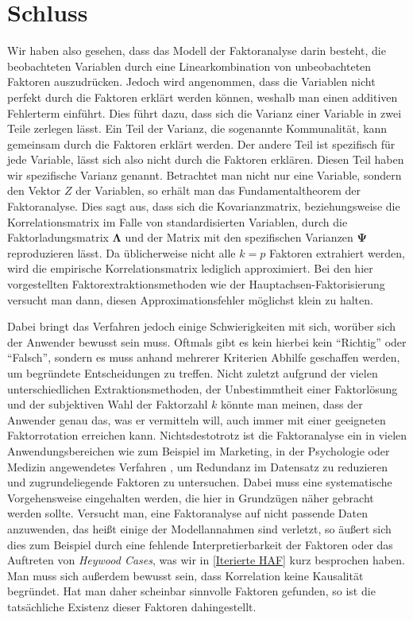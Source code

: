 \documentclass[11pt]{scrartcl}
\begin{document}
	
	\newpage
	\section{Schluss}
	
	Wir haben also gesehen, dass das Modell der Faktoranalyse darin besteht, die beobachteten
	Variablen durch eine Linearkombination von unbeobachteten Faktoren auszudrücken. Jedoch wird angenommen, dass die Variablen nicht
	perfekt durch die Faktoren erklärt werden können, weshalb man einen additiven Fehlerterm einführt.
	Dies führt dazu, dass sich die Varianz einer Variable in zwei Teile zerlegen lässt. Ein Teil der Varianz, die sogenannte Kommunalität,
	kann gemeinsam durch die Faktoren erklärt werden. Der andere Teil ist
	spezifisch für jede Variable, lässt sich also nicht durch die Faktoren erklären. Diesen Teil haben wir spezifische
	Varianz genannt. Betrachtet man nicht nur eine Variable, sondern den Vektor $Z$ der Variablen, so
	erhält man das Fundamentaltheorem der Faktoranalyse. Dies sagt aus, dass sich die Kovarianzmatrix,
	beziehungsweise die Korrelationsmatrix im Falle von standardisierten Variablen, durch die Faktorladungsmatrix $\mathbf{\Lambda}$
	und der Matrix mit den spezifischen Varianzen $\mathbf{\Psi}$ reproduzieren lässt. Da üblicherweise nicht alle $k = p$ Faktoren
	extrahiert werden, wird die empirische Korrelationsmatrix lediglich approximiert. 
	Bei den hier vorgestellten Faktorextraktionsmethoden
	wie der Hauptachsen-Faktorisierung versucht man dann, diesen Approximationsfehler möglichst klein zu halten.
	
	Dabei bringt das Verfahren jedoch einige Schwierigkeiten mit sich, worüber sich der Anwender bewusst sein muss.
	Oftmals gibt es kein hierbei kein \enquote{Richtig} oder \enquote{Falsch}, sondern es muss anhand mehrerer Kriterien
	Abhilfe geschaffen werden, um begründete Entscheidungen zu treffen. Nicht zuletzt aufgrund der vielen unterschiedlichen Extraktionsmethoden, der Unbestimmtheit einer Faktorlösung und der subjektiven Wahl der Faktorzahl $k$
	könnte man meinen, dass der Anwender genau das, was er vermitteln will, auch immer mit einer geeigneten
	Faktorrotation erreichen kann. Nichtsdestotrotz ist die Faktoranalyse ein in vielen Anwendungsbereichen wie zum Beispiel im Marketing, in der Psychologie oder Medizin angewendetes Verfahren \parencite[415]{Backhaus.2021}, um Redundanz im Datensatz zu reduzieren und zugrundeliegende Faktoren zu untersuchen. Dabei
	muss eine systematische Vorgehensweise eingehalten werden, die hier in Grundzügen näher gebracht werden sollte. Versucht man,
	eine Faktoranalyse auf nicht passende Daten anzuwenden, das heißt einige der Modellannahmen sind verletzt, so
	äußert sich dies zum Beispiel durch eine fehlende Interpretierbarkeit der Faktoren oder das Auftreten von \textit{Heywood Cases}, was wir in \ref{Iterierte HAF} kurz besprochen haben. Man muss sich außerdem bewusst sein, dass Korrelation keine Kausalität begründet. Hat man daher scheinbar sinnvolle Faktoren gefunden, so ist die tatsächliche Existenz
	dieser Faktoren dahingestellt.
\end{document}
